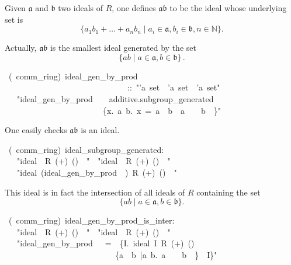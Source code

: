 \documentclass[12pt]{scrartcl}
\begin{document}
Given $\mathfrak{a}$ and $\mathfrak{b}$ two ideals of $R$, one defines $\mathfrak{a} \mathfrak{b}$ to be the ideal whose underlying set is 
\[
	\lbrace a_1 b_1 + \dots + a_n b_n \mid a_i \in \mathfrak{a}, b_i \in \mathfrak{b}, n \in \mathbb{N} \rbrace.
\]

Actually, $\mathfrak{a} \mathfrak{b}$ is the smallest ideal generated by the set 
	\[
	\lbrace a b \mid a \in \mathfrak{a}, b \in \mathfrak{b} \rbrace \, .
	\]
	

\begin{isabelle}
\ (\ comm\_ring)\ ideal\_gen\_by\_prod\ \isanewline
\ \ \ \ \ \ \ \ \ \ \ \ \ \ \ \ \ \ \ \ \ \ \ \ \ \ \ \ \ \ ::\ "'a\ set\ \isasymRightarrow \ 'a\ set\ \isasymRightarrow \ 'a\ set"\isanewline
\ \ \ "ideal\_gen\_by\_prod\ \isasymaa \ \isasymbb \ \isasymequiv \ additive.subgroup\_generated\ \isanewline
\ \ \ \ \ \ \ \ \ \ \ \ \ \ \ \ \ \ \ \ \ \ \ \ \{x.\ \isasymexists a\ b.\ x\ =\ a\ \isasymcdot \ b\ \isasymand \ a\ \isasymin \ \isasymaa \ \isasymand \ b\ \isasymin \ \isasymbb \}"
\end{isabelle}

One easily checks $\mathfrak{a} \mathfrak{b}$ is an ideal.


\begin{isabelle}
\ (\ comm\_ring)\ ideal\_subgroup\_generated:\isanewline
\ \ \ "ideal\ \isasymaa \ R\ (+)\ (\isasymcdot )\ \isasymzero \ \isasymone "\ \ "ideal\ \isasymbb \ R\ (+)\ (\isasymcdot )\ \isasymzero \ \isasymone "\isanewline
\ \ \ "ideal\ (ideal\_gen\_by\_prod\ \isasymaa \ \isasymbb )\ R\ (+)\ (\isasymcdot )\ \isasymzero \ \isasymone "
\end{isabelle}

This ideal is in fact the intersection of all ideals of $R$ containing the set
	\[
	\lbrace a b \mid a \in \mathfrak{a}, b \in \mathfrak{b} \rbrace .
	\]
	
\begin{isabelle}
\ (\ comm\_ring)\ ideal\_gen\_by\_prod\_is\_inter:\isanewline
\ \ \ "ideal\ \isasymaa \ R\ (+)\ (\isasymcdot )\ \isasymzero \ \isasymone "\ \ "ideal\ \isasymbb \ R\ (+)\ (\isasymcdot )\ \isasymzero \ \isasymone "\isanewline
\ \ \ "ideal\_gen\_by\_prod\ \isasymaa \ \isasymbb \ =\ \isasymInter \ \{I.\ ideal\ I\ R\ (+)\ (\isasymcdot )\ \isasymzero \ \isasymone \ \isanewline
\ \ \ \ \ \ \ \ \ \ \ \ \ \ \ \ \ \ \ \ \ \ \ \ \ \ \isasymand \ \{a\ \isasymcdot \ b\ |a\ b.\ a\ \isasymin \ \isasymaa \ \isasymand \ b\ \isasymin \ \isasymbb \}\ \isasymsubseteq \ I\}"
\end{isabelle}
\end{document}
